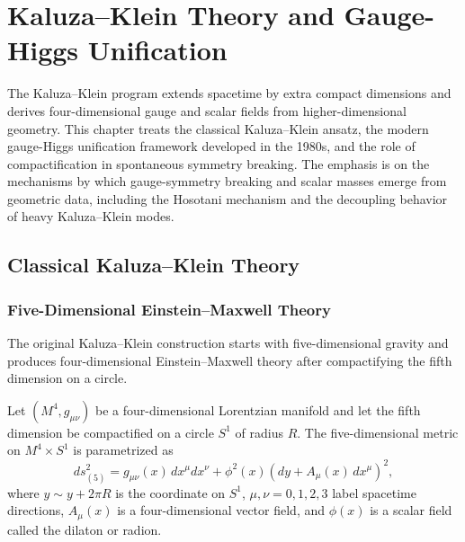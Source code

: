 \chapter{Kaluza--Klein Theory and Gauge-Higgs Unification}
\label{ch:kaluza-klein-gauge-higgs-unification}

\ConventionsMixed

The Kaluza--Klein program extends spacetime by extra compact dimensions and
derives four-dimensional gauge and scalar fields from higher-dimensional
geometry.  This chapter treats the classical Kaluza--Klein ansatz, the modern
gauge-Higgs unification framework developed in the 1980s, and the role of
compactification in spontaneous symmetry breaking.  The emphasis is on the
mechanisms by which gauge-symmetry breaking and scalar masses emerge from
geometric data, including the Hosotani mechanism and the decoupling behavior of
heavy Kaluza--Klein modes.

\section{Classical Kaluza--Klein Theory}

\subsection{Five-Dimensional Einstein--Maxwell Theory}

The original Kaluza--Klein construction \cite{Kaluza1921, Klein1926} starts
with five-dimensional gravity and produces four-dimensional Einstein--Maxwell
theory after compactifying the fifth dimension on a circle.

\begin{hypothesis}
\label{hyp:kaluza-klein-ansatz}
Let \((M^4, g_{\mu\nu})\) be a four-dimensional Lorentzian manifold and let the
fifth dimension be compactified on a circle \(S^1\) of radius \(R\).  The
five-dimensional metric on \(M^4 \times S^1\) is parametrized as
\begin{equation}
  ds^2_{(5)} = g_{\mu\nu}(x)\,dx^\mu dx^\nu
  + \phi^2(x) \left( dy + A_\mu(x)\,dx^\mu \right)^2,
  \label{eq:kk-metric-ansatz}
\end{equation}
where \(y \sim y + 2\pi R\) is the coordinate on \(S^1\), \(\mu, \nu = 0,1,2,3\)
label spacetime directions, \(A_\mu(x)\) is a four-dimensional vector field,
and \(\phi(x)\) is a scalar field called the dilaton or radion.
\end{hypothesis}


